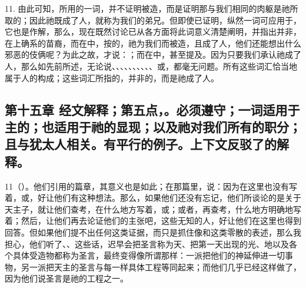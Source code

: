11. 由此可知，所用的一词，并不证明被造，而是证明那与我们相同的肉躯是祂所取的；因此祂既成了人，就称为我们的弟兄。但即使已证明，纵然一词可应用于，它也是作解，那么，现在既然讨论已从各方面将此词意义清楚阐明，并指出并非，在上确系的苗裔，而在中，按的，祂为我们而被造，且成了人，他们还能想出什么邪恶的伎俩呢？为此之故，才说：；而在中，甚至提及。因为只要我们承认祂成了人，那么如先前所述，无论说、、、、、、、、、、或，都毫无问题。所有这些词汇恰当地属于人的构成；这些词汇所指的，并非的，而是祂成了人。\par


\subsection{第十五章 经文解释；第五点，。必须遵守；一词适用于主的；也适用于祂的显现；以及祂对我们所有的职分；且与犹太人相关。有平行的例子。上下文反驳了的解释。}

11（）。他们引用的篇章，其意义也是如此；在那篇里，说：因为在这里也没有写着，或，好让他们有这种想法。那么，如果他们还没有忘记，他们所谈论的是关于天主子，就让他们查考，在什么地方写着，或；或者，再查考，什么地方明确地写着；然后，让他们再去论证他们的主张吧，这些无知的人，好让他们在这里也得到回答。但如果他们提不出任何这类证据，而只是抓住像和这类零散的表述，那么我担心，他们听了、、这些话，迟早会把圣言称为天、把第一天出现的光、地以及各个具体受造物都称为圣言，最终变得像所谓那样：一派把他们的神延伸进一切事物，另一派把天主的圣言与每一样具体工程等同起来；而他们几乎已经这样做了，因为他们说圣言是祂的工程之一。\par

